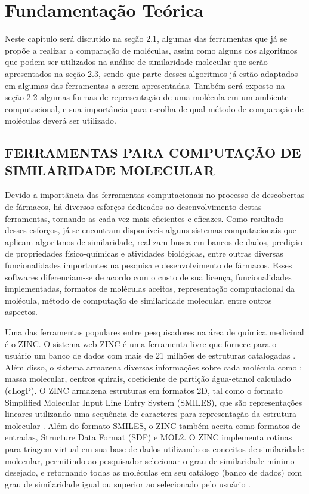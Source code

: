 
\chapter{Fundamentação Teórica}
\label{chap:fundam}
Neste capítulo será discutido na seção 2.1, algumas das ferramentas que já se propõe a realizar
a comparação de moléculas, assim como alguns dos algoritmos que podem ser utilizados na 
análise de similaridade molecular que serão apresentados na seção 2.3, sendo que parte desses 
algoritmos já estão adaptados em algumas das ferramentas a serem apresentadas.
Também será exposto na seção 2.2 algumas formas de representação de uma molécula em um 
ambiente computacional, e sua importância para escolha de qual método de comparação de 
moléculas deverá ser utilizado.
\newpage
\section{FERRAMENTAS PARA COMPUTAÇÃO DE SIMILARIDADE MOLECULAR}

Devido a importância das ferramentas computacionais no processo de descobertas de fármacos, há diversos esforços dedicados ao desenvolvimento destas ferramentas, tornando-as cada vez mais eficientes e eficazes. Como resultado desses esforços, já se encontram disponíveis alguns sistemas computacionais que aplicam algoritmos de similaridade, realizam busca em bancos de dados, predição de propriedades físico-químicas e atividades biológicas, entre outras diversas funcionalidades importantes na pesquisa e desenvolvimento de fármacos. Esses softwares diferenciam-se de acordo com o custo de sua licença, funcionalidades implementadas, formatos de moléculas aceitos, representação computacional da molécula, método de computação de similaridade molecular, entre outros aspectos.

Uma das ferramentas populares entre pesquisadores na área de química medicinal é o ZINC. O sistema web ZINC é uma ferramenta livre que fornece para o usuário um banco de dados com mais de 21 milhões de estruturas catalogadas \cite{irwin2005zinc}. Além disso, o sistema armazena diversas informações  sobre cada molécula como : massa molecular, centros quirais, coeficiente de partição água-etanol calculado (cLogP). O ZINC armazena estruturas em formatos 2D, tal como o formato Simplified Molecular Input Line Entry System (SMILES), que são representações lineares utilizando uma sequência de caracteres para representação da estrutura molecular \cite{kumar2012}. Além do formato SMILES, o ZINC também aceita como formatos de entradas, Structure Data Format (SDF) e MOL2. O ZINC implementa rotinas para triagem virtual em sua base de dados utilizando os conceitos de similaridade molecular, permitindo ao pesquisador selecionar o grau de similaridade mínimo desejado, e retornando todas as moléculas em seu catálogo (banco de dados) com grau de similaridade igual ou superior ao selecionado pelo usuário \cite{irwin2005zinc}.

